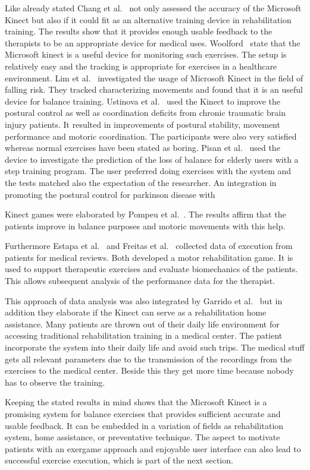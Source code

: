 Like already stated Chang et al.~\cite{Chang2012-hz} not only assessed the accuracy of the Microsoft Kinect but also if it could fit as an alternative training device in rehabilitation training. The results show that it provides enough usable feedback to the therapists to be an appropriate device for medical uses. Woolford~\cite{Woolford2015-ub} state that the Microsoft kinect is a useful device for monitoring such exercises. The setup is relatively easy and the tracking is appropriate for exercises in a healthcare environment. Lim et al.~\cite{Lim2015-pw} investigated the usage of Microsoft Kinect in the field of falling risk. They tracked characterizing movements and found that it is an useful device for balance training. Ustinova et al.~\cite{Ustinova2014-ml} used the Kinect to improve the postural control as well as coordination deficits from chronic traumatic brain injury patients. It resulted in improvements of postural stability, movement performance and motoric coordination. The participants were also very satisfied whereas normal exercises have been stated as boring. Pisan et al.~\cite{Pisan2013-sf} used the device to investigate the prediction of the loss of balance for elderly users with a step training program. The user preferred doing exercises with the system and the tests matched also the expectation of the researcher. An integration in promoting the postural control for parkinson disease with 

Kinect games were elaborated by Pompeu et al.~\cite{Pompeu2014-yl, Pompeu2015-vp}. The results affirm that the patients improve in balance purposes and motoric movements with this help.

Furthermore Estapa et al.~\cite{Estepa2016-oj} and Freitas et al.~\cite{Freitas2012-ae} collected data of execution from patients for medical reviews. Both developed a motor rehabilitation game. It is used to support therapeutic exercises and evaluate biomechanics of the patients. This allows subsequent analysis of the performance data for the therapist.

This approach of data analysis was also integrated by Garrido et al.~\cite{Garrido2013-zs} but in addition they elaborate if the Kinect can serve as a rehabilitation home assistance. Many patients are thrown out of their daily life environment for accessing traditional rehabilitation training in a medical center. The patient incorporate the system into their daily life and avoid such trips. The medical stuff gets all relevant parameters due to the transmission of the recordings from the exercises to the medical center. Beside this they get more time because nobody has to observe the training.

Keeping the stated results in mind shows that the Microsoft Kinect is a promising system for balance exercises that provides sufficient accurate and usable feedback. It can be embedded in a variation of fields as rehabilitation system, home assistance, or preventative technique. The aspect to motivate patients with an exergame approach and enjoyable user interface can also lead to successful exercise execution, which is part of the next section.
